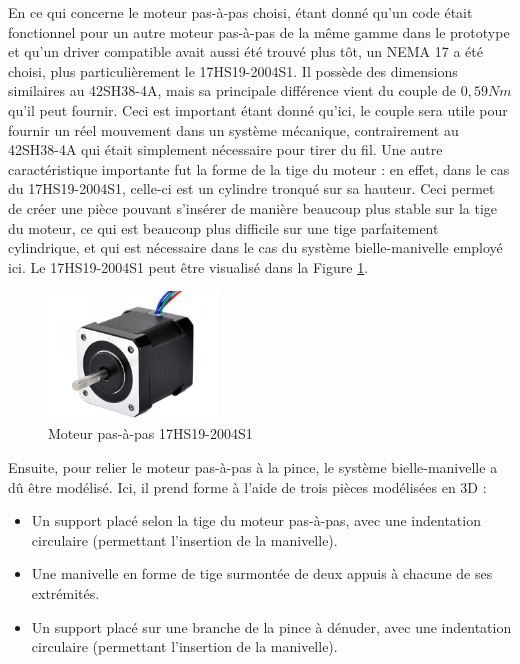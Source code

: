 \par En ce qui concerne le moteur pas-à-pas choisi, étant donné qu'un code était fonctionnel pour un autre moteur pas-à-pas de la même gamme dans le prototype et qu'un driver compatible avait aussi été trouvé plus tôt, un NEMA 17 a été choisi, plus particulièrement le 17HS19-2004S1. Il possède des dimensions similaires au 42SH38-4A, mais sa principale différence vient du couple de $0,59 Nm$ qu'il peut fournir. Ceci est important étant donné qu'ici, le couple sera utile pour fournir un réel mouvement dans un système mécanique, contrairement au 42SH38-4A qui était simplement nécessaire pour tirer du fil. Une autre caractéristique importante fut la forme de la tige du moteur : en effet, dans le cas du 17HS19-2004S1, celle-ci est un cylindre tronqué sur sa hauteur. Ceci permet de créer une pièce pouvant s'insérer de manière beaucoup plus stable sur la tige du moteur, ce qui est beaucoup plus difficile sur une tige parfaitement cylindrique, et qui est nécessaire dans le cas du système bielle-manivelle employé ici. Le 17HS19-2004S1 peut être visualisé dans la Figure \ref{fig:17HS19-2004S1}.

\begin{figure}[H]
    \centering
    \includegraphics[width=0.4\textwidth]{images/17HS19-2004S1.jpg}
    \caption{Moteur pas-à-pas 17HS19-2004S1}
    \label{fig:17HS19-2004S1}
\end{figure}

\par Ensuite, pour relier le moteur pas-à-pas à la pince, le système bielle-manivelle a dû être modélisé. Ici, il prend forme à l'aide de trois pièces modélisées en 3D :

\begin{itemize}
    \item Un support placé selon la tige du moteur pas-à-pas, avec une indentation circulaire (permettant l'insertion de la manivelle).
    \item Une manivelle en forme de tige surmontée de deux appuis à chacune de ses extrémités.
    \item Un support placé sur une branche de la pince à dénuder, avec une indentation circulaire (permettant l'insertion de la manivelle).
\end{itemize}

